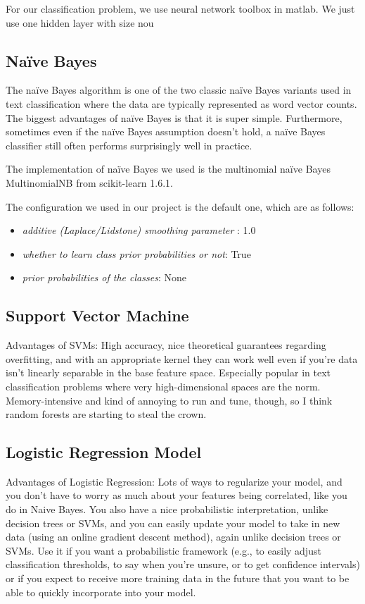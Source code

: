 \documentclass[letterpaper,11pt,twocolumn]{article}
\begin{document}
For our classification problem, we use neural network toolbox in matlab. We just use one hidden layer with size nou
\subsection{Na{\"i}ve Bayes}
The na{\"i}ve Bayes algorithm is one of the two classic na{\"i}ve Bayes variants used in text classification where the data are typically represented as word vector counts. The biggest advantages of na{\"i}ve Bayes is that it is super simple. Furthermore, sometimes even if the na{\"i}ve Bayes assumption doesn't hold, a na{\"i}ve Bayes classifier still often performs surprisingly well in practice.

The implementation of na{\"i}ve Bayes we used is the multinomial na{\"i}ve Bayes MultinomialNB from scikit-learn 1.6.1.

The configuration we used in our project is the default one, which are as follows:
\begin{itemize}
\item \emph{additive (Laplace/Lidstone) smoothing parameter }: 1.0
\item \emph{whether to learn class prior probabilities or not}: True
\item \emph{prior probabilities of the classes}: None
\end{itemize}

\subsection{Support Vector Machine}
Advantages of SVMs: High accuracy, nice theoretical guarantees regarding overfitting, and with an appropriate kernel they can work well even if you're data isn't linearly separable in the base feature space. Especially popular in text classification problems where very high-dimensional spaces are the norm. Memory-intensive and kind of annoying to run and tune, though, so I think random forests are starting to steal the crown.


\subsection{Logistic Regression Model}
Advantages of Logistic Regression: Lots of ways to regularize your model, and you don't have to worry as much about your features being correlated, like you do in Naive Bayes. You also have a nice probabilistic interpretation, unlike decision trees or SVMs, and you can easily update your model to take in new data (using an online gradient descent method), again unlike decision trees or SVMs. Use it if you want a probabilistic framework (e.g., to easily adjust classification thresholds, to say when you're unsure, or to get confidence intervals) or if you expect to receive more training data in the future that you want to be able to quickly incorporate into your model.
\end{document}
